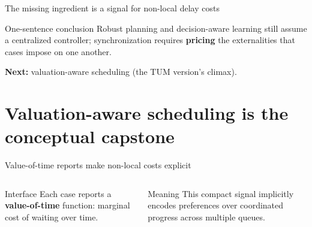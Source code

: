 \documentclass[aspectratio=169,10pt]{beamer}
\newif\iflong
\newcommand{\btext}[1]{\textbf{\color{darkred}#1}}
\begin{document}
\iflong\else
\begin{frame}{The missing ingredient is a signal for non-local delay costs}
  \begin{block}{One-sentence conclusion}
    Robust planning and decision-aware learning still assume a centralized controller;
    synchronization requires \btext{pricing} the externalities that cases impose on one another.
  \end{block}
  \vspace{0.2cm}
  \btext{Next:} valuation-aware scheduling (the TUM version’s climax).
\end{frame}
\fi

\iflong
\section{Valuation-aware scheduling is the conceptual capstone}

\begin{frame}{Value-of-time reports make non-local costs explicit}
  \begin{columns}[T]
      \begin{block}{Interface}
        Each case reports a \btext{value-of-time} function: marginal cost of waiting over time.
      \end{block}
      \vspace{0.15cm}
      \begin{block}{Meaning}
        This compact signal implicitly encodes preferences over coordinated progress across multiple queues.
      \end{block}

      \centering
  \end{columns}
\end{frame}
\end{document}
